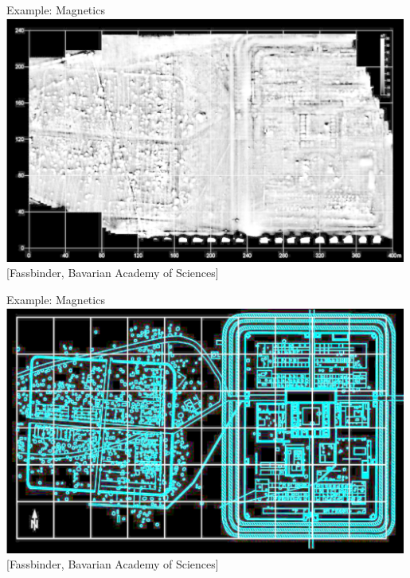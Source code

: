 \begin{frame}
    \begin{PointSix}{Example: Magnetics}
        \includegraphics[width=0.99\textwidth]{Figures/General/GeophysExamples/Magnetics1_FassbinderBADS.png}
        \tiny[Fassbinder, Bavarian Academy of Sciences]
           \end{PointSix}
\end{frame}
\begin{frame}
    \begin{PointSix}{Example: Magnetics}
        \includegraphics[width=0.99\textwidth]{Figures/General/GeophysExamples/Magnetics2_FassbinderBADS.png}
        \tiny[Fassbinder, Bavarian Academy of Sciences]
           \end{PointSix}
\end{frame}

